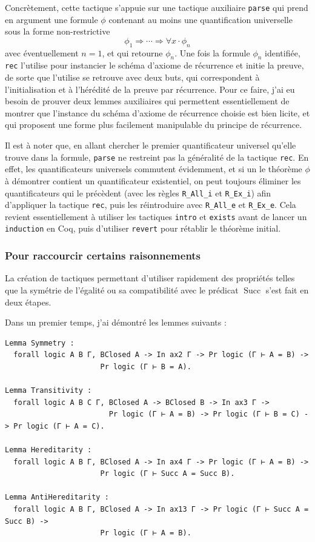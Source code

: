 \documentclass[a4paper]{article}
\DeclareMathOperator{\Succ}{\mathrm{Succ}}
\theoremstyle{remark}
\theoremstyle{remark}
\theoremstyle{remark}
\theoremstyle{definition}
\theoremstyle{definition}
\theoremstyle{definition}
\begin{document}
Concrètement, cette tactique s'appuie sur une tactique auxiliaire \verb+parse+ qui prend en argument une formule $\phi$ contenant au moins une quantification universelle sous la forme non-restrictive \[ \phi_1 \Rightarrow \cdots \Rightarrow \forall x \cdot \phi_n \] avec éventuellement $n = 1$, et qui retourne $\phi_n$. Une fois la formule $\phi_n$ identifiée, \verb+rec+ l'utilise pour instancier le schéma d'axiome de récurrence et initie la preuve, de sorte que l'utilise se retrouve avec deux buts, qui correspondent à l'initialisation et à l'hérédité de la preuve par récurrence. Pour ce faire, j'ai eu besoin de prouver deux lemmes auxiliaires qui permettent essentiellement de montrer que l'instance du schéma d'axiome de récurrence choisie est bien licite, et qui proposent une forme plus facilement manipulable du principe de récurrence.

Il est à noter que, en allant chercher le premier quantificateur universel qu'elle trouve dans la formule, \verb+parse+ ne restreint pas la généralité de la tactique \verb+rec+. En effet, les quantificateurs universels commutent évidemment, et si un le théorème $\phi$ à démontrer contient un quantificateur existentiel, on peut toujours éliminer les quantificateurs qui le précèdent (avec les règles \verb+R_All_i+ et \verb+R_Ex_i+) afin d'appliquer la tactique \verb+rec+, puis les réintroduire avec \verb+R_All_e+ et \verb+R_Ex_e+. Cela revient essentiellement à utiliser les tactiques \verb+intro+ et \verb+exists+ avant de lancer un \verb+induction+ en Coq, puis d'utiliser \verb+revert+ pour rétablir le théorème initial.

\subsubsection{Pour raccourcir certains raisonnements}

La création de tactiques permettant d'utiliser rapidement des propriétés telles que la symétrie de l'égalité ou sa compatibilité avec le prédicat $\Succ$ s'est fait en deux étapes.

Dans un premier temps, j'ai démontré les lemmes suivants :
\begin{verbatim}
Lemma Symmetry :
  forall logic A B Γ, BClosed A -> In ax2 Γ -> Pr logic (Γ ⊢ A = B) ->
                      Pr logic (Γ ⊢ B = A).

Lemma Transitivity :
  forall logic A B C Γ, BClosed A -> BClosed B -> In ax3 Γ ->
                        Pr logic (Γ ⊢ A = B) -> Pr logic (Γ ⊢ B = C) -> Pr logic (Γ ⊢ A = C).

Lemma Hereditarity :
  forall logic A B Γ, BClosed A -> In ax4 Γ -> Pr logic (Γ ⊢ A = B) ->
                      Pr logic (Γ ⊢ Succ A = Succ B).

Lemma AntiHereditarity :
  forall logic A B Γ, BClosed A -> In ax13 Γ -> Pr logic (Γ ⊢ Succ A = Succ B) ->
                      Pr logic (Γ ⊢ A = B).
\end{verbatim}
\end{document}
